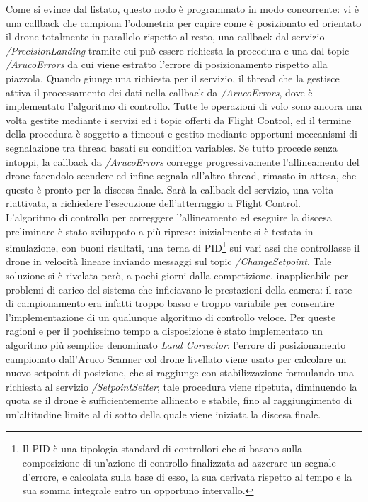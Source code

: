 Come si evince dal listato, questo nodo è programmato in modo concorrente: vi è una callback che campiona l'odometria per capire come è posizionato ed orientato il drone totalmente in parallelo rispetto al resto, una callback dal servizio \emph{/PrecisionLanding} tramite cui può essere richiesta la procedura e una dal topic \emph{/ArucoErrors} da cui viene estratto l'errore di posizionamento rispetto alla piazzola. Quando giunge una richiesta per il servizio, il thread che la gestisce attiva il processamento dei dati nella callback da \emph{/ArucoErrors}, dove è implementato l'algoritmo di controllo. Tutte le operazioni di volo sono ancora una volta gestite mediante i servizi ed i topic offerti da Flight Control, ed il termine della procedura è soggetto a timeout e gestito mediante opportuni meccanismi di segnalazione tra thread basati su condition variables. Se tutto procede senza intoppi, la callback da \emph{/ArucoErrors} corregge progressivamente l'allineamento del drone facendolo scendere ed infine segnala all'altro thread, rimasto in attesa, che questo è pronto per la discesa finale. Sarà la callback del servizio, una volta riattivata, a richiedere l'esecuzione dell'atterraggio a Flight Control.\\
L'algoritmo di controllo per correggere l'allineamento ed eseguire la discesa preliminare è stato sviluppato a più riprese: inizialmente si è testata in simulazione, con buoni risultati, una terna di PID\footnote{Il PID è una tipologia standard di controllori che si basano sulla composizione di un'azione di controllo finalizzata ad azzerare un segnale d'errore, e calcolata sulla base di esso, la sua derivata rispetto al tempo e la sua somma integrale entro un opportuno intervallo.} sui vari assi che controllasse il drone in velocità lineare inviando messaggi sul topic \emph{/ChangeSetpoint}. Tale soluzione si è rivelata però, a pochi giorni dalla competizione, inapplicabile per problemi di carico del sistema che inficiavano le prestazioni della camera: il rate di campionamento era infatti troppo basso e troppo variabile per consentire l'implementazione di un qualunque algoritmo di controllo veloce. Per queste ragioni e per il pochissimo tempo a disposizione è stato implementato un algoritmo più semplice denominato \emph{Land Corrector}: l'errore di posizionamento campionato dall'Aruco Scanner col drone livellato viene usato per calcolare un nuovo setpoint di posizione, che si raggiunge con stabilizzazione formulando una richiesta al servizio \emph{/SetpointSetter}; tale procedura viene ripetuta, diminuendo la quota se il drone è sufficientemente allineato e stabile, fino al raggiungimento di un'altitudine limite al di sotto della quale viene iniziata la discesa finale.

